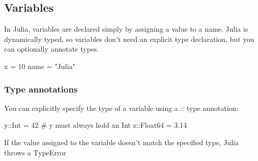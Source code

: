 \documentclass{report}
\begin{document}
    \bigbreak \noindent 
    \subsection{Variables}
    \bigbreak \noindent 
    In Julia, variables are declared simply by assigning a value to a name. Julia is dynamically typed, so variables don't need an explicit type declaration, but you can optionally annotate types.
    \bigbreak \noindent 
    \begin{jlcode}
    x = 10
    name = "Julia"
    \end{jlcode}

    \bigbreak \noindent 
    \subsubsection{Type annotations}
    \bigbreak \noindent 
    You can explicitly specify the type of a variable using a :: type annotation:
    \bigbreak \noindent 
    \begin{jlcode}
        y::Int = 42    # y must always hold an Int
        z::Float64 = 3.14
    \end{jlcode}
    \bigbreak \noindent 
    If the value assigned to the variable doesn’t match the specified type, Julia throws a TypeError

    \bigbreak \noindent 
\end{document}
